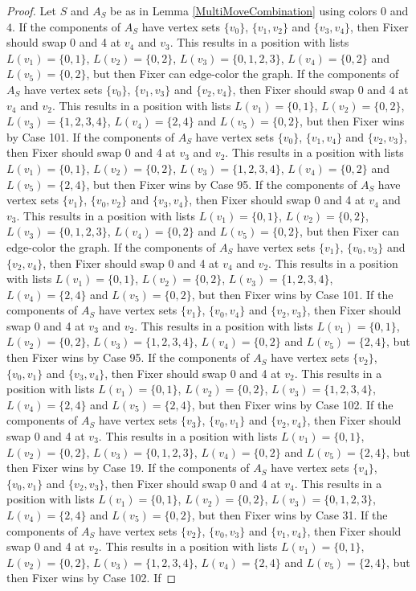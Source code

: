 \documentclass[12pt]{amsart}
\theoremstyle{plain}
\theoremstyle{definition}
\theoremstyle{remark}
\begin{document}
\begin{proof}
Let $S$ and $A_S$ be as in Lemma \ref{MultiMoveCombination} using colors $0$ and $4$. If the components of $A_S$ have vertex sets $\{v_0\}$, $\{v_1, v_2\}$ and $\{v_3, v_4\}$, then Fixer should swap 0 and 4 at $v_4$ and $v_3$. This results in a position with lists $L(v_1) = \{0, 1\}$, $L(v_2) = \{0, 2\}$, $L(v_3) = \{0, 1, 2, 3\}$, $L(v_4) = \{0, 2\}$ and $L(v_5) = \{0, 2\}$, but then Fixer can edge-color the graph. If the components of $A_S$ have vertex sets $\{v_0\}$, $\{v_1, v_3\}$ and $\{v_2, v_4\}$, then Fixer should swap 0 and 4 at $v_4$ and $v_2$. This results in a position with lists $L(v_1) = \{0, 1\}$, $L(v_2) = \{0, 2\}$, $L(v_3) = \{1, 2, 3, 4\}$, $L(v_4) = \{2, 4\}$ and $L(v_5) = \{0, 2\}$, but then Fixer wins by Case 101. If the components of $A_S$ have vertex sets $\{v_0\}$, $\{v_1, v_4\}$ and $\{v_2, v_3\}$, then Fixer should swap 0 and 4 at $v_3$ and $v_2$. This results in a position with lists $L(v_1) = \{0, 1\}$, $L(v_2) = \{0, 2\}$, $L(v_3) = \{1, 2, 3, 4\}$, $L(v_4) = \{0, 2\}$ and $L(v_5) = \{2, 4\}$, but then Fixer wins by Case 95. If the components of $A_S$ have vertex sets $\{v_1\}$, $\{v_0, v_2\}$ and $\{v_3, v_4\}$, then Fixer should swap 0 and 4 at $v_4$ and $v_3$. This results in a position with lists $L(v_1) = \{0, 1\}$, $L(v_2) = \{0, 2\}$, $L(v_3) = \{0, 1, 2, 3\}$, $L(v_4) = \{0, 2\}$ and $L(v_5) = \{0, 2\}$, but then Fixer can edge-color the graph. If the components of $A_S$ have vertex sets $\{v_1\}$, $\{v_0, v_3\}$ and $\{v_2, v_4\}$, then Fixer should swap 0 and 4 at $v_4$ and $v_2$. This results in a position with lists $L(v_1) = \{0, 1\}$, $L(v_2) = \{0, 2\}$, $L(v_3) = \{1, 2, 3, 4\}$, $L(v_4) = \{2, 4\}$ and $L(v_5) = \{0, 2\}$, but then Fixer wins by Case 101. If the components of $A_S$ have vertex sets $\{v_1\}$, $\{v_0, v_4\}$ and $\{v_2, v_3\}$, then Fixer should swap 0 and 4 at $v_3$ and $v_2$. This results in a position with lists $L(v_1) = \{0, 1\}$, $L(v_2) = \{0, 2\}$, $L(v_3) = \{1, 2, 3, 4\}$, $L(v_4) = \{0, 2\}$ and $L(v_5) = \{2, 4\}$, but then Fixer wins by Case 95. If the components of $A_S$ have vertex sets $\{v_2\}$, $\{v_0, v_1\}$ and $\{v_3, v_4\}$, then Fixer should swap 0 and 4 at $v_2$. This results in a position with lists $L(v_1) = \{0, 1\}$, $L(v_2) = \{0, 2\}$, $L(v_3) = \{1, 2, 3, 4\}$, $L(v_4) = \{2, 4\}$ and $L(v_5) = \{2, 4\}$, but then Fixer wins by Case 102. If the components of $A_S$ have vertex sets $\{v_3\}$, $\{v_0, v_1\}$ and $\{v_2, v_4\}$, then Fixer should swap 0 and 4 at $v_3$. This results in a position with lists $L(v_1) = \{0, 1\}$, $L(v_2) = \{0, 2\}$, $L(v_3) = \{0, 1, 2, 3\}$, $L(v_4) = \{0, 2\}$ and $L(v_5) = \{2, 4\}$, but then Fixer wins by Case 19. If the components of $A_S$ have vertex sets $\{v_4\}$, $\{v_0, v_1\}$ and $\{v_2, v_3\}$, then Fixer should swap 0 and 4 at $v_4$. This results in a position with lists $L(v_1) = \{0, 1\}$, $L(v_2) = \{0, 2\}$, $L(v_3) = \{0, 1, 2, 3\}$, $L(v_4) = \{2, 4\}$ and $L(v_5) = \{0, 2\}$, but then Fixer wins by Case 31. If the components of $A_S$ have vertex sets $\{v_2\}$, $\{v_0, v_3\}$ and $\{v_1, v_4\}$, then Fixer should swap 0 and 4 at $v_2$. This results in a position with lists $L(v_1) = \{0, 1\}$, $L(v_2) = \{0, 2\}$, $L(v_3) = \{1, 2, 3, 4\}$, $L(v_4) = \{2, 4\}$ and $L(v_5) = \{2, 4\}$, but then Fixer wins by Case 102. If 
\end{proof}
\end{document}
